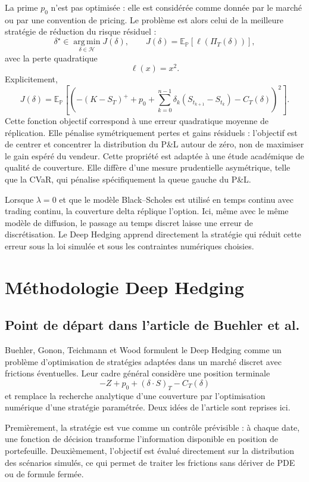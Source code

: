 \documentclass[11pt,a4paper]{article}
\begin{document}
La prime $p_0$ n'est pas optimisée : elle est considérée comme donnée par le
marché ou par une convention de pricing. Le problème est alors celui de la
meilleure stratégie de réduction du risque résiduel :
\[
\delta^\star
\in
\operatorname*{arg\,min}_{\delta\in\mathcal{H}}
J(\delta),
\qquad
J(\delta)
=
\mathbb{E}_{\mathbb{P}}
\left[
\ell\left(\Pi_T(\delta)\right)
\right],
\]
avec la perte quadratique
\[
\ell(x)=x^2.
\]
Explicitement,
\[
J(\delta)
=
\mathbb{E}_{\mathbb{P}}
\left[
\left(
-(K-S_T)^+
+p_0
+\sum_{k=0}^{n-1}\delta_k(S_{t_{k+1}}-S_{t_k})
-C_T(\delta)
\right)^2
\right].
\]
Cette fonction objectif correspond à une erreur quadratique moyenne de
réplication. Elle pénalise symétriquement pertes et gains résiduels : l'objectif
est de centrer et concentrer la distribution du P\&L autour de zéro, non de
maximiser le gain espéré du vendeur. Cette propriété est adaptée à une étude
académique de qualité de couverture. Elle diffère d'une mesure prudentielle
asymétrique, telle que la CVaR, qui pénalise spécifiquement la queue gauche du
P\&L.

Lorsque $\lambda=0$ et que le modèle Black--Scholes est utilisé en temps
continu avec trading continu, la couverture delta réplique l'option. Ici, même
avec le même modèle de diffusion, le passage au temps discret laisse une erreur
de discrétisation. Le Deep Hedging apprend directement la stratégie qui réduit
cette erreur sous la loi simulée et sous les contraintes numériques choisies.

\section{Méthodologie Deep Hedging}

\subsection{Point de départ dans l'article de Buehler et al.}

Buehler, Gonon, Teichmann et Wood formulent le Deep Hedging comme un problème
d'optimisation de stratégies adaptées dans un marché discret avec frictions
éventuelles. Leur cadre général considère une position terminale
\[
-Z+p_0+(\delta\cdot S)_T-C_T(\delta)
\]
et remplace la recherche analytique d'une couverture par l'optimisation
numérique d'une stratégie paramétrée. Deux idées de l'article sont reprises ici.

Premièrement, la stratégie est vue comme un contrôle prévisible : à chaque date,
une fonction de décision transforme l'information disponible en position de
portefeuille. Deuxièmement, l'objectif est évalué directement sur la distribution
des scénarios simulés, ce qui permet de traiter les frictions sans dériver de
PDE ou de formule fermée.
\end{document}

